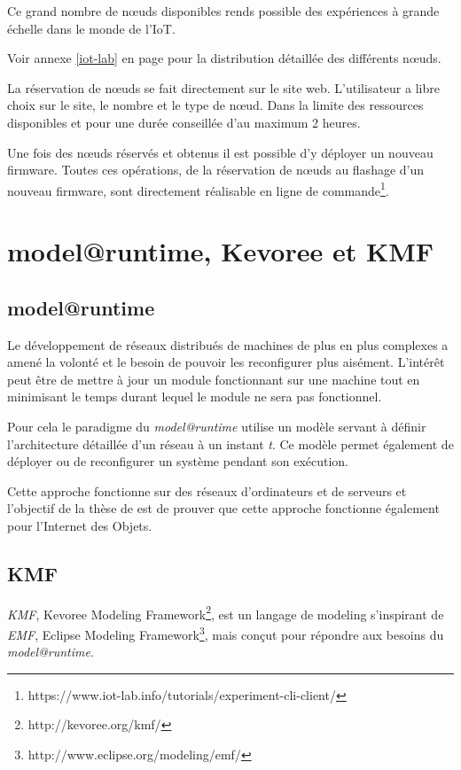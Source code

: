 Ce grand nombre de nœuds disponibles rends possible des expériences à grande échelle dans le monde de l'IoT.

Voir annexe \ref{iot-lab} en page \pageref{iot-lab} pour la distribution détaillée des différents nœuds.

La réservation de nœuds se fait directement sur le site web. L'utilisateur a libre choix sur le site, le nombre et le type de nœud. Dans la limite des ressources disponibles et pour une durée conseillée d'au maximum 2 heures.

Une fois des nœuds réservés et obtenus il est possible d'y déployer un nouveau firmware. Toutes ces opérations, de la réservation de nœuds au flashage d'un nouveau firmware, sont directement réalisable en ligne de commande\footnote{https://www.iot-lab.info/tutorials/experiment-cli-client/}.

\section{model@runtime, Kevoree et KMF}

\subsection{model@runtime}

Le développement de réseaux distribués de machines de plus en plus complexes a amené la volonté et le besoin de pouvoir les reconfigurer plus aisément. L'intérêt peut être de mettre à jour un module fonctionnant sur une machine tout en minimisant le temps durant lequel le module ne sera pas fonctionnel.

Pour cela le paradigme du \emph{model@runtime} utilise un modèle servant à définir l'architecture détaillée d'un réseau à un instant \emph{t}. Ce modèle permet également de déployer ou de reconfigurer un système pendant son exécution.

Cette approche fonctionne sur des réseaux d'ordinateurs et de serveurs \cite{fouquet} et l'objectif de la thèse de \paco est de prouver que cette approche fonctionne également pour l'Internet des Objets.

\subsection{KMF}

\emph{KMF}, Kevoree Modeling Framework\footnote{http://kevoree.org/kmf/}, est un langage de modeling s'inspirant de \emph{EMF}, Eclipse Modeling Framework\footnote{http://www.eclipse.org/modeling/emf/}, mais conçut pour répondre aux besoins du \emph{model@runtime}.

